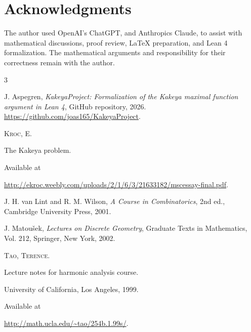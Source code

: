 \documentclass[11pt, letterpaper]{nyjm}
\begin{document}
	
		
	\section*{Acknowledgments}
	
	The author used OpenAI's ChatGPT, and Anthropics Claude, to assist with
	mathematical discussions, proof review, LaTeX
	preparation, and Lean 4 formalization.
	The mathematical arguments and responsibility
	for their correctness remain with the author.
	
	\begin{thebibliography}{3}
		
		J. Aspegren,
		\emph{KakeyaProject: Formalization of the Kakeya maximal function argument in Lean 4},
		GitHub repository, 2026.
		\url{https://github.com/joas165/KakeyaProject}.
		
		
		
		{\scshape Kroc, E.} 
		
		The Kakeya problem. 
		
		Available at 
		
		\url{http://ekroc.weebly.com/uploads/2/1/6/3/21633182/mscessay-final.pdf}.
		
		J. H. van Lint and R. M. Wilson,
		\textit{A Course in Combinatorics},
		2nd ed., Cambridge University Press, 2001.
		
		J. Matou\v{s}ek,
		\textit{Lectures on Discrete Geometry},
		Graduate Texts in Mathematics, Vol. 212,
		Springer, New York, 2002.
		
		
		{\scshape Tao, Terence.}
		
		Lecture notes for harmonic analysis course. 
		
		University of California, Los Angeles, 1999. 
		
		Available at 
		
		\url{http://math.ucla.edu/~tao/254b.1.99s/}.
		
		
		
		
	\end{thebibliography}
	
	
\end{document}
